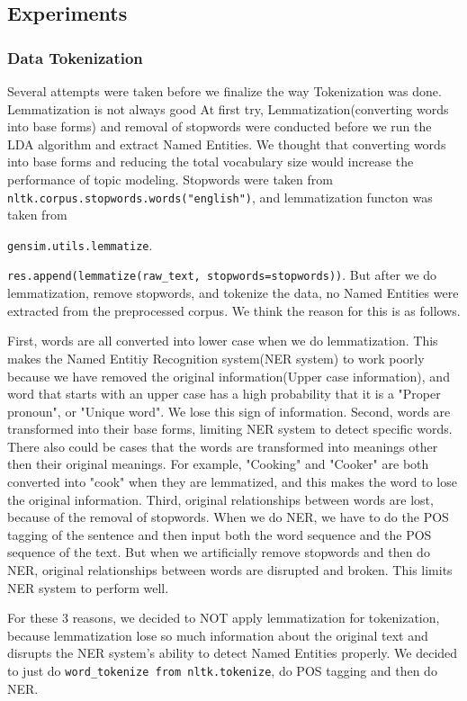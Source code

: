 \subsection{Experiments}
\subsubsection{Data Tokenization}
Several attempts were taken before we finalize the way Tokenization was done. Lemmatization is not always good
At first try, Lemmatization(converting words into base forms) and removal of stopwords were conducted before we run the LDA algorithm and extract Named Entities. We thought that converting words into base forms and reducing the total vocabulary size would increase the performance of topic modeling. Stopwords were taken from
\texttt{nltk.corpus.stopwords.words("english")}, and lemmatization functon was taken from

\texttt{gensim.utils.lemmatize}.

\texttt{res.append(lemmatize(raw\_text, stopwords=stopwords))}. But after we do lemmatization, remove stopwords, and tokenize the data, no Named Entities were extracted from the preprocessed corpus. We think the reason for this is as follows. 

First, words are all converted into lower case when we do lemmatization. This makes the Named Entitiy Recognition system(NER system) to work poorly because we have removed the original information(Upper case information), and word that starts with an upper case has a high probability that it is a "Proper pronoun", or "Unique word". We lose this sign of information.
Second, words are transformed into their base forms, limiting NER system to detect specific words. There also could be cases that the words are transformed into meanings other then their original meanings. For example, "Cooking" and "Cooker" are both converted into "cook" when they are lemmatized, and this makes the word to lose the original information.
Third, original relationships between words are lost, because of the removal of stopwords. When we do NER, we have to do the POS tagging of the sentence and then input both the word sequence and the POS sequence of the text. But when we artificially remove stopwords and then do NER, original relationships between words are disrupted and broken. This limits NER system to perform well.

For these 3 reasons, we decided to NOT apply lemmatization for tokenization, because lemmatization lose so much information about the original text and disrupts the NER system's ability to detect Named Entities properly. We decided to just do
\texttt{word_tokenize from nltk.tokenize}, do POS tagging and then do NER.


